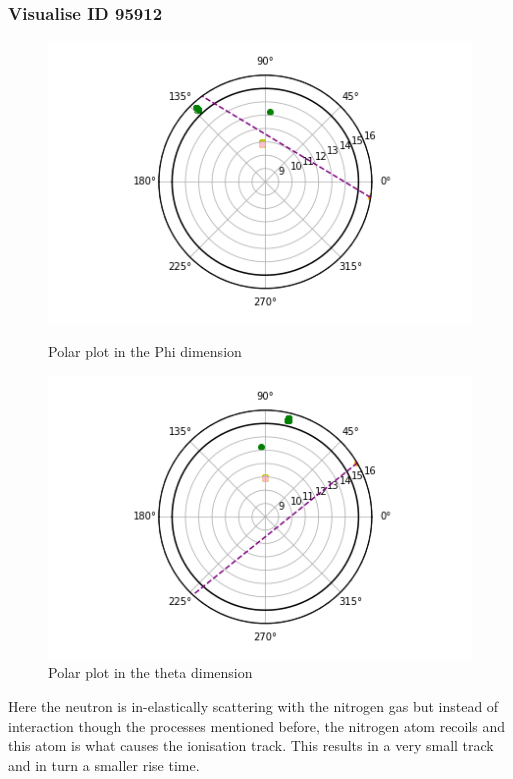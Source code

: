\documentclass[a4paper]{article}
\begin{document}
\subsubsection{Visualise ID 95912}
\begin{figure}[H]
    \centering
    \begin{minipage}{.5\textwidth}
        \centering
        \includegraphics[width=1\linewidth]{Fast/95912_phi.png}
        \caption{Polar plot in the Phi dimension}
        \label{fig:prob1_6_2}
    \end{minipage}%
    \begin{minipage}{0.5\textwidth}
        \centering
        \includegraphics[width=1\linewidth]{Fast/95912_theta.png}
        \caption{Polar plot in the theta dimension}
        \label{fig:prob1_6_1}
    \end{minipage}
\end{figure}
\noindent Here the neutron is in-elastically scattering with the nitrogen gas but instead of interaction though the processes mentioned before, the nitrogen atom recoils and this atom is what causes the ionisation track. This results in a very small track and in turn a smaller rise time.
\end{document}
